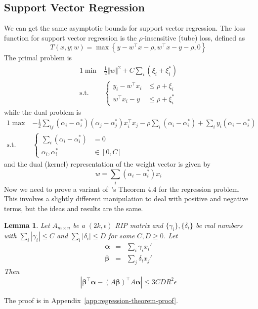 \documentclass[english]{article}
\theoremstyle{plain}
\newtheorem{lemma}{Lemma}
\begin{document}
\subsection{Support Vector Regression}
We can get the same asymptotic bounds for support vector regression.
The loss function for support vector regression is the $\rho$-insensitive
(tube) loss, defined as
\begin{equation}
T(x,y;w)=\max\left\{ y-w^{\top}x-\rho,w^{\top}x-y-\rho,0\right\} \label{eq:epsilon-insensitive}
\end{equation}
The primal problem is
\begin{alignat*}{1}
\min & \frac{1}{2}\left\Vert w\right\Vert ^{2}+C\sum_{i}\left(\xi_{i}+\xi_{i}^{*}\right)\\
\text{s.t.} & \begin{cases}
y_{i}-w^{\top}x_{i} & \leq\rho+\xi_{i}\\
w^{\top}x_{i}-y & \leq\rho+\xi_{i}^{*}
\end{cases}
\end{alignat*}
while the dual problem is
\begin{alignat*}{1}
\max & -\frac{1}{2}\sum_{ij}\left(\alpha_{i}-\alpha_{i}^{*}\right)\left(\alpha_{j}-\alpha_{j}^{*}\right)x_{i}^{\top}x_{j}-\rho\sum_{i}\left(\alpha_{i}-\alpha_{i}^{*}\right)+\sum_{i}y_{i}\left(\alpha_{i}-\alpha_{i}^{*}\right)\\
\text{s.t.} & \begin{cases}
\sum_{i}\left(\alpha_{i}-\alpha_{i}^{*}\right) & =0\\
\alpha_{i},\alpha_{i}^{*} & \in[0,C]
\end{cases}
\end{alignat*}
and the dual (kernel) representation of the weight vector is given
by
\begin{equation}
w=\sum_{i}\left(\alpha_{i}-\alpha_{i}^{*}\right)x_{i}\label{eq:dual-w}
\end{equation}
Now we need to prove a variant of~\citet{Calderbank09}'s Theorem 4.4 for the regression problem.
This involves a slightly different manipulation to deal with positive
and negative terms, but the ideas and results are the same.
\begin{lemma}
\label{lem:my-theorem-44}Let $A_{m\times n}$ be a $(2k,\epsilon)$
RIP matrix and $\{\gamma_{i}\},\{\delta_{i}\}$ be real numbers with
$\sum_{i}\left|\gamma_{i}\right|\leq C$ and $\sum_{i}\left|\delta_{i}\right|\leq D$
for some $C,D\geq0$. Let
\begin{eqnarray*}
\bm{\alpha} & = & \sum_{i}\gamma_{i}x_{i}'\\
\bm{\beta} & = & \sum_{j}\delta_{i}x_{j}'
\end{eqnarray*}
Then
\[
\left|\bm{\beta}^{\top}\bm{\alpha}-\left(A\bm{\beta}\right)^{\top}A\bm{\alpha}\right|\leq3CDR^{2}\epsilon
\]
\end{lemma}
The proof is in Appendix~\ref{app:regression-theorem-proof}.
\end{document}
